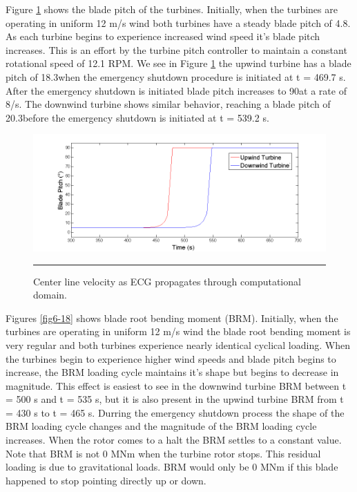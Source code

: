 Figure \ref{fig6-17} shows the blade pitch of the turbines. Initially, when the turbines are operating in uniform 12 m/s wind both turbines have a steady blade pitch of 4.8\degree. As each turbine begins to experience increased wind speed it's blade pitch increases. This is an effort by the turbine pitch controller to maintain a constant rotational speed of 12.1 RPM. We see in Figure \ref{fig6-17} the upwind turbine has a blade pitch of 18.3\degree when the emergency shutdown procedure is initiated at t = 469.7 s. After the emergency shutdown is initiated blade pitch increases to 90\degree at a rate of 8\degree /s. The downwind turbine shows similar behavior, reaching a blade pitch of 20.3\degree before the emergency shutdown is initiated at t = 539.2 s.

\begin{figure}[htbp] \label{fig6-17}
	\centering
		\includegraphics[trim = {1cm 0 2cm 0}, clip, width = \linewidth]{Figures/ch6Figures/fig6-17.png}
		\rule{35em}{0.5pt}
	\caption{Center line velocity as ECG propagates through computational domain.}
\end{figure}

Figures \ref{fig6-18} shows blade root bending moment (BRM). Initially, when the turbines are operating in uniform 12 m/s wind the blade root bending moment is very regular and both turbines experience nearly identical cyclical loading. When the turbines begin to experience higher wind speeds and blade pitch begins to increase, the BRM loading cycle maintains it's shape but begins to decrease in magnitude. This effect is easiest to see in the downwind turbine BRM between t = 500 s and t = 535 s, but it is also present in the upwind turbine BRM from t = 430 s to t = 465 s. Durring the emergency shutdown process the shape of the BRM loading cycle changes and the magnitude of the BRM loading cycle increases. When the rotor comes to a halt the BRM settles to a constant value. Note that BRM is not 0 MNm when the turbine rotor stops. This residual loading is due to gravitational loads. BRM would only be 0 MNm if this blade happened to stop pointing directly up or down.

